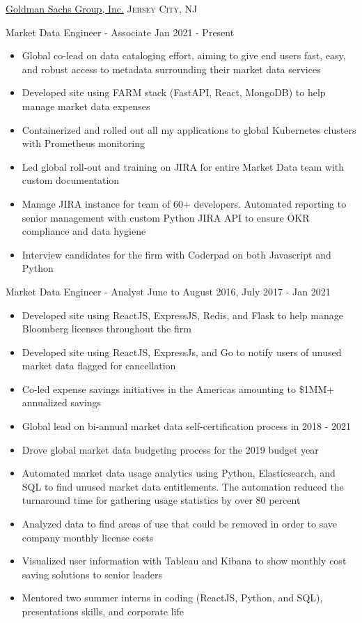 \documentclass[10pt,letterpaper]{article}
\begin{document}
\headedsection  %
  {\href{http://www.goldmansachs.com/}{Goldman Sachs Group, Inc.}}
  {\textsc{Jersey City, NJ}} {%
  \headedsubsection
    {Market Data Engineer - Associate}
    {Jan 2021 - Present}
    {\begin{itemize}
    \item Global co-lead on data cataloging effort, aiming to give end users fast, easy, and robust access to metadata surrounding their market data services
    \item Developed site using FARM stack (FastAPI, React, MongoDB) to help manage market data expenses
    \item Containerized and rolled out all my applications to global Kubernetes clusters with Prometheus monitoring
    \item Led global roll-out and training on JIRA for entire Market Data team with custom documentation
    \item Manage JIRA instance for team of 60+ developers. Automated reporting to senior management with custom Python JIRA API to ensure OKR compliance and data hygiene
    \item Interview candidates for the firm with Coderpad on both Javascript and Python
    \end{itemize}}
  \headedsubsection
    {Market Data Engineer - Analyst}
    {June to August 2016, July 2017 - Jan 2021}
    {\begin{itemize}
    \item Developed site using ReactJS, ExpressJS, Redis, and Flask to help manage Bloomberg licenses throughout the firm
    \item Developed site using ReactJS, ExpressJs, and Go to notify users of unused market data flagged for cancellation
    \item Co-led expense savings initiatives in the Americas amounting to \$1MM+ annualized savings
    \item Global lead on bi-annual market data self-certification process in 2018 - 2021
    \item Drove global market data budgeting process for the 2019 budget year
    \item Automated market data usage analytics using Python, Elasticsearch, and SQL to find unused market data entitlements. The automation reduced the turnaround time for gathering usage statistics by over 80 percent
    \item Analyzed data to find areas of use that could be removed in order to save company monthly license costs
    \item Visualized user information with Tableau and Kibana to show monthly cost saving solutions to senior leaders
    \item Mentored two summer interns in coding (ReactJS, Python, and SQL), presentations skills, and corporate life
    \end{itemize}}
}
\end{document}

